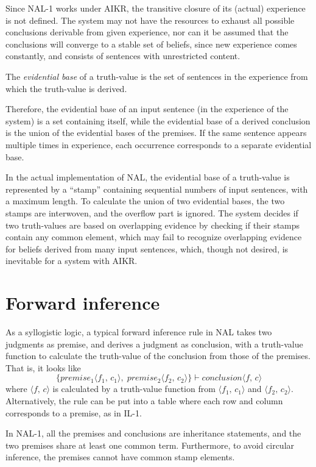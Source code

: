 Since NAL-1 works under AIKR, the transitive closure of its (actual) experience is not defined. The system may not have the resources to exhaust all possible conclusions derivable from given experience, nor can it be assumed that the conclusions will converge to a stable set of beliefs, since new experience comes constantly, and consists of sentences with unrestricted content.

\begin{defi} 
The \emph{evidential base} of a truth-value is the set of sentences in the experience from which the truth-value is derived.
\end{defi}
Therefore, the evidential base of an input sentence (in the experience of the system) is a set containing itself, while the evidential base of a derived conclusion is the union of the evidential bases of the premises. If the same sentence appears multiple times in experience, each occurrence corresponds to a separate evidential base.  

In the actual implementation of NAL, the evidential base of a truth-value is represented by a ``stamp'' containing sequential numbers of input sentences, with a maximum length. To calculate the union of two evidential bases, the two stamps are interwoven, and the overflow part is ignored. The system decides if two truth-values are based on overlapping evidence by checking if their stamps contain any common element, which may fail to recognize overlapping evidence for beliefs derived from many input sentences, which, though not desired, is inevitable for a system with AIKR.


\section{Forward inference}

As a syllogistic logic, a typical forward inference rule in NAL takes two judgments as premise, and derives a judgment as conclusion, with a truth-value function to calculate the truth-value of the conclusion from those of the premises. That is, it looks like
\[\{premise_1 \langle  f_1, \, c_1 \rangle , \; premise_2 \langle  f_2, \, c_2 \rangle \} \vdash conclusion \langle  f, \, c \rangle \]
where \(\langle  f, \, c \rangle \) is calculated by a truth-value function from \(\langle  f_1, \, c_1 \rangle \) and \(\langle  f_2, \, c_2 \rangle \). Alternatively, the rule can be put into a table where each row and column corresponds to a premise, as in IL-1.

In NAL-1, all the premises and conclusions are inheritance statements, and the two premises share at least one common term. Furthermore, to avoid circular inference, the premises cannot have common stamp elements.

